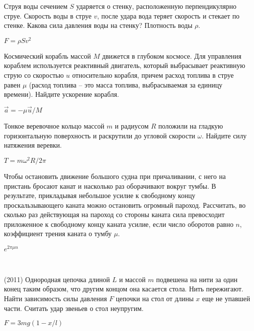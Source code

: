\begin{ex}
Струя воды сечением $S$ ударяется о стенку, расположенную перпендикулярно струе. Скорость воды в струе $v$, после удара вода теряет скорость и стекает по стенке. Какова сила давления воды на стенку? Плотность воды $\rho$.
\begin{ans}
$F = \rho S v^2$
\end{ans}
\end{ex}

\begin{ex}
Космический корабль массой $M$ движется в глубоком космосе. Для управления кораблем используется реактивный двигатель, который выбрасывает реактивную струю со скоростью $u$ относительно корабля, причем расход топлива в струе равен $\mu$ (расход топлива -- это масса топлива, выбрасываемая за единицу времени). Найдите ускорение корабля.
\begin{ans}
$\vec a = - \mu \vec u / M$
\end{ans}
\end{ex}

\begin{ex}
Тонкое веревочное кольцо массой $m$ и радиусом $R$ положили на гладкую горизонтальную поверхность и раскрутили до угловой скорости $\omega$. Найдите силу натяжения веревки.
\begin{ans}
$T = m\omega^2R/2 \pi$
\end{ans}
\end{ex}

\begin{ex}
Чтобы остановить движение большого судна при причаливании, с него на пристань бросают канат и насколько раз оборачивают вокруг тумбы. В результате, прикладывая небольшое усилие к свободному концу проскальзывающего каната можно остановить огромный пароход. Рассчитать, во сколько раз действующая на пароход со стороны каната сила превосходит приложенное к свободному концу каната усилие, если число оборотов равно $n$, коэффициент трения каната о тумбу $\mu$.
\begin{ans}
$e^{2\pi \mu n}$
\end{ans}
\end{ex}

\begin{ex}
\hspace{0pt} \\
\begin{minipage}{.65\textwidth}
(2011) Однородная цепочка длиной $L$ и массой $m$ подвешена на нити за один конец таким образом, что другим концом она касается стола. Нить пережигают. Найти зависимость силы давления $F$ цепочки на стол от длины $x$ еще не упавшей части. Считать удар звеньев о стол неупругим.
\end{minipage}
\begin{minipage}{.35\textwidth}
\centering

\end{minipage}
\begin{ans}
$F = 3mg(1-x/l)$
\end{ans}
\end{ex}

